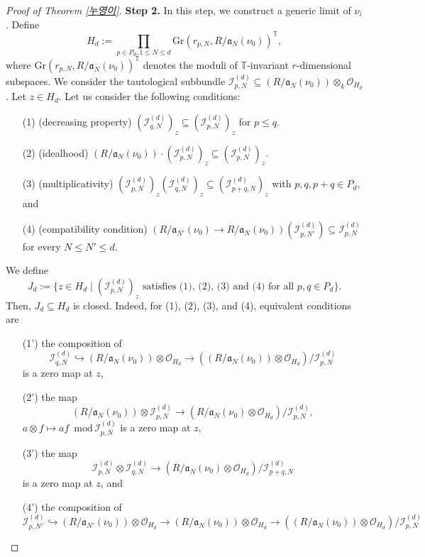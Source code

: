 \documentclass[a4paper,12pt]{amsart}
\theoremstyle{definition} %
\theoremstyle{remark}
\numberwithin{equation}{section}
\begin{document}
\begin{proof}[Proof of Theorem \ref{누영이}]
\noindent \textbf{Step 2.} In this step, we construct a generic limit of $\nu_i$. Define
$$ H_d:=\prod_{p\in P_d, 1\le N\le d}\mathrm{Gr}(r_{p,N},R/\mathfrak{a}_N(\nu_0))^{\mathbb{T}},$$
where $\mathrm{Gr}(r_{p,N},R/\mathfrak{a}_N(\nu_0))^{\mathbb{T}}$ denotes the moduli of $\mathbb{T}$-invariant $r$-dimensional subspaces. We consider the tautological subbundle $\mathcal{I}^{(d)}_{p,N}\subseteq (R/\mathfrak{a}_N(\nu_0))\otimes_k \mathcal{O}_{H_d}$. Let $z\in H_d$. Let us consider the following conditions:
\begin{itemize}
    \item[(1)] (decreasing property) $(\mathcal{I}^{(d)}_{q,N})_z\subseteq (\mathcal{I}^{(d)}_{p,N})_z$ for $p\le q$.
    \item[(2)] (idealhood) $(R/\mathfrak{a}_N(\nu_0))\cdot (\mathcal{I}^{(d)}_{p,N})_z\subseteq (\mathcal{I}^{(d)}_{p,N})_z$.
    \item[(3)] (multiplicativity) $(\mathcal{I}^{(d)}_{p,N})_z(\mathcal{I}^{(d)}_{q,N})_z\subseteq (\mathcal{I}^{(d)}_{p+q,N})_z$ with $p,q,p+q\in P_d$, and
    \item[(4)] (compatibility condition) $(R/\mathfrak{a}_{N'}(\nu_0)\to R/\mathfrak{a}_N(\nu_0))(\mathcal{I}^{(d)}_{p,N'})\subseteq \mathcal{I}^{(d)}_{p,N}$ for every $N\le N'\le d$.
\end{itemize}
We define
$$ J_d:=\{z\in H_d\mid (\mathcal{I}^{(d)}_{p,N})_z\text{ satisfies (1), (2), (3) and (4) for all }p,q\in P_d\}.$$
Then, $J_d\subseteq H_d$ is closed. Indeed, for (1), (2), (3), and (4), equivalent conditions are
\begin{itemize}
    \item[(1')] the composition of 
    $$\mathcal{I}^{(d)}_{q,N}\hookrightarrow (R/\mathfrak{a}_N(\nu_0))\otimes \mathcal{O}_{H_d}\to ((R/\mathfrak{a}_N(\nu_0))\otimes \mathcal{O}_{H_d})/\mathcal{I}^{(d)}_{p,N}$$
    is a zero map at $z$,
    \item[(2')] the map
    $$(R/\mathfrak{a}_N(\nu_0))\otimes \mathcal{I}^{(d)}_{p,N}\to (R/\mathfrak{a}_N(\nu_0)\otimes \mathcal{O}_{H_d})/\mathcal{I}^{(d)}_{p,N},$$ 
    $a\otimes f\mapsto af \,\,\,\mathrm{mod}\,\mathcal{I}^{(d)}_{p,N}$ is a zero map at $z$,
    \item[(3')] the map 
    $$\mathcal{I}^{(d)}_{p,N}\otimes \mathcal{I}^{(d)}_{q,N}\to (R/\mathfrak{a}_N(\nu_0)\otimes \mathcal{O}_{H_d})/\mathcal{I}^{(d)}_{p+q,N}$$
    is a zero map at $z$, and
    \item[(4')] the composition of
    $$ \mathcal{I}^{(d)}_{p,N'}\hookrightarrow (R/\mathfrak{a}_{N'}(\nu_0))\otimes \mathcal{O}_{H_d}\to (R/\mathfrak{a}_N(\nu_0))\otimes \mathcal{O}_{H_d}\to ((R/\mathfrak{a}_N(\nu_0))\otimes \mathcal{O}_{H_d})/\mathcal{I}^{(d)}_{p,N}$$

\end{itemize}
\end{proof}
\end{document}
